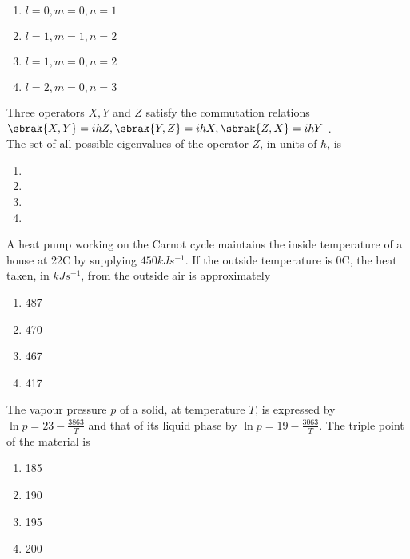 \begin{multicols}{2}
    \begin{enumerate}
        \item $l=0,m=0,n=1$
        \item $l=1,m=1,n=2$
        \item $l=1,m=0,n=2$
        \item $l=2,m=0,n=3$
    \end{enumerate}
\end{multicols}
\item  Three operators $X,Y$ and $Z$ satisfy the commutation relations\\ $\sbrak{X,Y}=i\hbar Z,\sbrak{Y, Z}=i\hbar X,\sbrak{Z, X}=i\hbar Y$ .\\The set of all possible eigenvalues of the operator $Z$, in units of $\hbar$, is
\begin{multicols}{2}
    \begin{enumerate}
        \item {}
        \item {}
        \item {}
        \item {}
    \end{enumerate}
\end{multicols}
\item A heat pump working on the Carnot cycle maintains the inside temperature of a house at 22\degree C by supplying $450 kJ s^{-1}$. If the outside temperature is 0\degree C, the heat taken, in $kJ s^{-1}$, from the outside air is approximately
\begin{multicols}{4}
    \begin{enumerate}
        \item 487
        \item 470
        \item 467
        \item 417
    \end{enumerate}
\end{multicols}
\item The vapour pressure $p$  of a solid, at temperature $T$, is expressed by $\ln p = 23-\frac{3863}{T}$ and that of its liquid phase by $\ln p = 19-\frac{3063}{T}$. The triple point of the material is
\begin{multicols}{4}
    \begin{enumerate}
        \item 185
        \item 190
        \item 195
        \item 200
    \end{enumerate}
\end{multicols}
